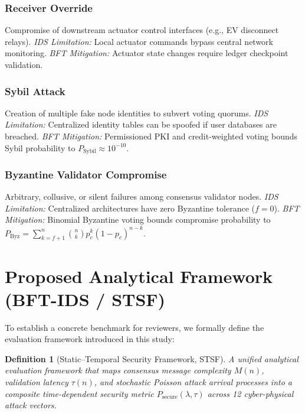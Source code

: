 \documentclass[10pt,twocolumn,journal]{IEEEtran}
\newtheorem{definition}{Definition}
\begin{document}
\subsubsection{Receiver Override} Compromise of downstream actuator control interfaces (e.g., EV disconnect relays). \emph{IDS Limitation:} Local actuator commands bypass central network monitoring. \emph{BFT Mitigation:} Actuator state changes require ledger checkpoint validation.

\subsubsection{Sybil Attack} Creation of multiple fake node identities to subvert voting quorums. \emph{IDS Limitation:} Centralized identity tables can be spoofed if user databases are breached. \emph{BFT Mitigation:} Permissioned PKI and credit-weighted voting bounds Sybil probability to $P_{\text{Sybil}} \approx 10^{-10}$.

\subsubsection{Byzantine Validator Compromise} Arbitrary, collusive, or silent failures among consensus validator nodes. \emph{IDS Limitation:} Centralized architectures have zero Byzantine tolerance ($f=0$). \emph{BFT Mitigation:} Binomial Byzantine voting bounds compromise probability to $P_{\text{Byz}} = \sum_{k=f+1}^n \binom{n}{k} p_c^k (1-p_c)^{n-k}$.

\section{Proposed Analytical Framework (BFT-IDS / STSF)}
\label{sec:framework}

To establish a concrete benchmark for reviewers, we formally define the evaluation framework introduced in this study:

\begin{definition}[Static–Temporal Security Framework, STSF]
A unified analytical evaluation framework that maps consensus message complexity $M(n)$, validation latency $\tau(n)$, and stochastic Poisson attack arrival processes into a composite time-dependent security metric $P_{\text{secure}}(\lambda, \tau)$ across 12 cyber-physical attack vectors.
\end{definition}
\end{document}
